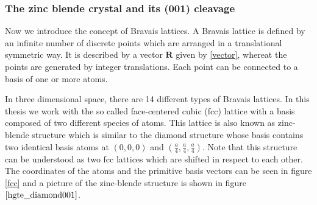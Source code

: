 	\subsubsection{The zinc blende crystal and its (001) cleavage} \label{cleavage_fcc}
	Now we introduce the concept of Bravais lattices. A Bravais lattice is defined by an infinite number of discrete points which are arranged in a translational symmetric way. It is described by a vector $\boldsymbol{R}$ given by \eqref{vector}, whereat the points are generated by integer translations. 
	Each point can be connected to a basis of one or more atoms.
	
	In three dimensional space, there are 14 different types of Bravais lattices. In this thesis we work with the so called face-centered cubic (fcc) lattice with a basis composed of two different species of atoms.
	This lattice is also known as zinc-blende structure which is similar to the diamond structure whose basis contains two identical basis atoms at $(0,0,0)$ and $(\frac{a}{4},\frac{a}{4},\frac{a}{4})$.
	Note that this structure can be understood as two fcc lattices which are shifted in respect to each other.
	The coordinates of the atoms and the primitive basis vectors can be seen in figure \ref{fcc} and a picture of the zinc-blende structure is shown in figure $\ref{hgte_diamond001}$.
	
